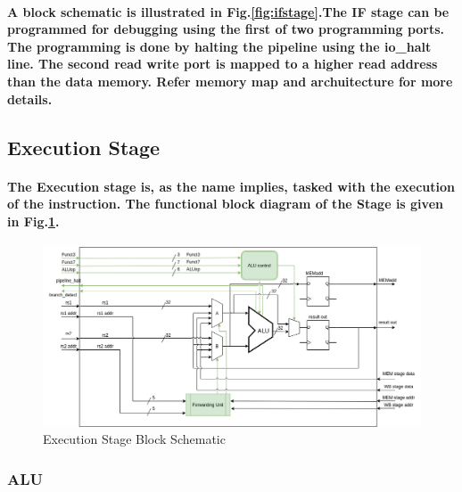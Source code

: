 \documentclass[12pt,a4paper]{report}
\begin{document}
\paragraph{\textrm{\textmd{A block schematic is illustrated in Fig.\ref{fig:ifstage}.The IF stage can be programmed for debugging using  the first of two programming ports. The programming is done by halting the pipeline using the \textbf{io\_halt} line. The second read write port is mapped to a higher read address than the data memory. Refer memory map and archuitecture for more details.}}}
\subsection{Execution Stage}
\paragraph{\textrm{\textmd{The Execution stage is, as the name implies, tasked with the execution of the instruction. The functional block diagram of the Stage is given in Fig.\ref{fig:exstage}.  }}}
\begin{figure}[h]
	\centering
	\includegraphics[scale=.35]{exstage.png}
	\caption{Execution Stage Block Schematic}
	\label{fig:exstage}
\end{figure}
\subsubsection{ALU}
\end{document}
